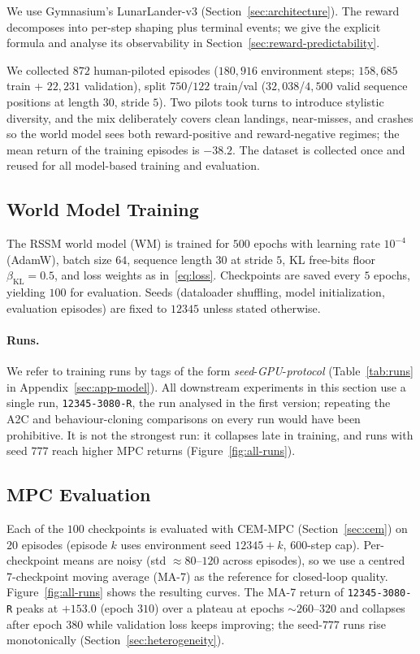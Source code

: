 \documentclass[11pt]{article}
\theoremstyle{remark}
\begin{document}
We use Gymnasium's LunarLander-v3 (Section~\ref{sec:architecture}). The reward decomposes into per-step shaping plus terminal events; we give the explicit formula and analyse its observability in Section~\ref{sec:reward-predictability}.

We collected $872$ human-piloted episodes ($180{,}916$ environment steps; $158{,}685$ train + $22{,}231$ validation), split $750/122$ train/val ($32{,}038$/$4{,}500$ valid sequence positions at length $30$, stride $5$). Two pilots took turns to introduce stylistic diversity, and the mix deliberately covers clean landings, near-misses, and crashes so the world model sees both reward-positive and reward-negative regimes; the mean return of the training episodes is $-38.2$. The dataset is collected once and reused for all model-based training and evaluation.

\subsection{World Model Training}

The RSSM world model (WM) is trained for $500$ epochs with learning rate $10^{-4}$ (AdamW), batch size $64$, sequence length $30$ at stride $5$, KL free-bits floor $\beta_{\text{KL}}{=}0.5$, and loss weights as in~\eqref{eq:loss}. Checkpoints are saved every $5$ epochs, yielding $100$ for evaluation. Seeds (dataloader shuffling, model initialization, evaluation episodes) are fixed to $12345$ unless stated otherwise.

\paragraph{Runs.} We refer to training runs by tags of the form \emph{seed}-\emph{GPU}-\emph{protocol} (Table~\ref{tab:runs} in Appendix~\ref{sec:app-model}). All downstream experiments in this section use a single run, \texttt{12345-3080-R}, the run analysed in the first version; repeating the A2C and behaviour-cloning comparisons on every run would have been prohibitive. It is not the strongest run: it collapses late in training, and runs with seed $777$ reach higher MPC returns (Figure~\ref{fig:all-runs}).

\subsection{MPC Evaluation}
\label{sec:mpc-perf}

Each of the $100$ checkpoints is evaluated with CEM-MPC (Section~\ref{sec:cem}) on $20$ episodes (episode $k$ uses environment seed $12345{+}k$, $600$-step cap). Per-checkpoint means are noisy (std $\approx 80$--$120$ across episodes), so we use a centred 7-checkpoint moving average (MA-7) as the reference for closed-loop quality. Figure~\ref{fig:all-runs} shows the resulting curves. The MA-7 return of \texttt{12345-3080-R} peaks at $+153.0$ (epoch $310$) over a plateau at epochs ${\sim}260$--$320$ and collapses after epoch $380$ while validation loss keeps improving; the seed-$777$ runs rise monotonically (Section~\ref{sec:heterogeneity}).
\end{document}
